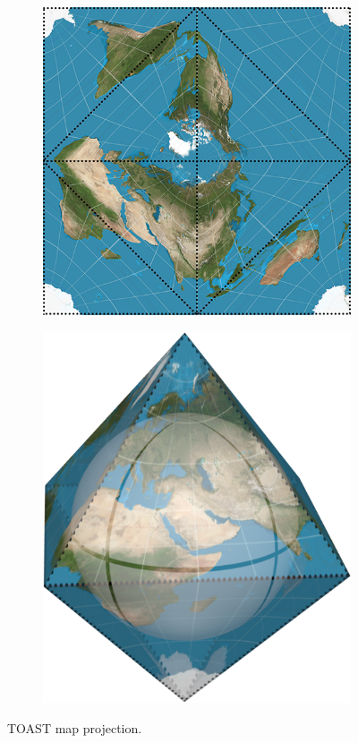 \begin{figure}[htbp]
    \centering
    \begin{subfigure}[bt]{0.3\textwidth}
        \includegraphics[width=\textwidth]{figures/developable_projected/toast.png}
    \end{subfigure}
    \qquad
    \begin{subfigure}[bt]{0.2\textwidth}
        \includegraphics[width=\textwidth]{figures/map_projection/projection_toast.png}
    \end{subfigure}
    \caption{TOAST map projection.}
    \label{fig:proj_toast}
\end{figure}

